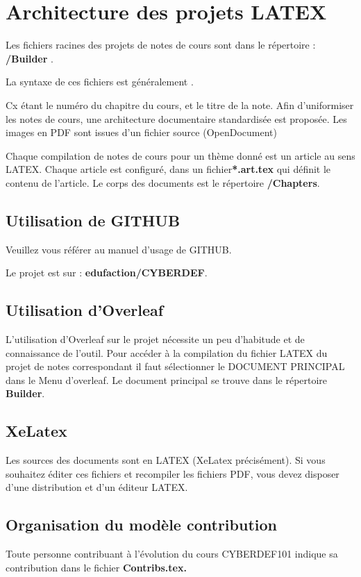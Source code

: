 \section{Architecture des projets LATEX}

\begin{frame}
	

Les fichiers racines des projets de notes de cours sont dans le répertoire : \textbf{/Builder} . 

La syntaxe de ces fichiers est généralement . 

Cx étant le numéro du chapitre du cours, et  le titre de la note.
Afin d'uniformiser les notes de cours, une architecture documentaire standardisée est proposée. 
Les images en PDF sont issues d'un fichier source (OpenDocument)

Chaque compilation de notes de cours pour un thème donné est un article au sens LATEX. Chaque article est configuré, dans un fichier\textbf{*.art.tex} qui définit le contenu de l'article. Le corps des documents est le répertoire \textbf{/Chapters}. 
\end{frame}

\subsection{Utilisation de GITHUB}

Veuillez vous référer au manuel d'usage de GITHUB. 

Le projet est sur : \textbf{edufaction/CYBERDEF}.

\subsection{Utilisation d'Overleaf}

L'utilisation d'Overleaf sur le projet nécessite un peu d'habitude et de connaissance de l'outil. Pour accéder à la compilation du fichier LATEX du projet de notes correspondant il faut sélectionner le DOCUMENT PRINCIPAL dans le Menu d'overleaf. Le document principal se trouve dans le répertoire \textbf{Builder}.

\subsection{XeLatex}

Les sources des documents sont en LATEX (XeLatex précisément). Si vous souhaitez éditer ces fichiers et recompiler les fichiers PDF, vous devez disposer d'une distribution et d'un éditeur LATEX.




\subsection{Organisation du modèle contribution}

Toute personne contribuant à l'évolution du cours CYBERDEF101 indique sa contribution dans le fichier \bf{Contribs.tex}.

